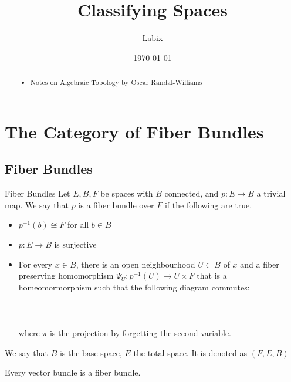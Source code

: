\documentclass[a4paper]{article}
\title{Classifying Spaces}
\author{Labix}
\date{\today}
\begin{document}
\maketitle
\begin{abstract}
\begin{itemize}
\item Notes on Algebraic Topology by Oscar Randal-Williams
\end{itemize}
\end{abstract}
\pagebreak
\tableofcontents

\pagebreak
\section{The Category of Fiber Bundles}
\subsection{Fiber Bundles}
\begin{defn}{Fiber Bundles}{} Let $E,B,F$ be spaces with $B$ connected, and $p:E\to B$ a trivial map. We say that $p$ is a fiber bundle over $F$ if the following are true. 
\begin{itemize}
\item $p^{-1}(b)\cong F$ for all $b\in B$
\item $p:E\to B$ is surjective
\item For every $x\in B$, there is an open neighbourhood $U\subset B$ of $x$ and a fiber preserving homomorphism $\Psi_U:p^{-1}(U)\to U\times F$ that is a homeomormorphism such that the following diagram commutes: \\~\\
\\~\\
where $\pi$ is the projection by forgetting the second variable. 
\end{itemize}
We say that $B$ is the base space, $E$ the total space. It is denoted as $(F,E,B)$
\end{defn}

\begin{lmm}{}{} Every vector bundle is a fiber bundle. 
\end{lmm}
\end{document}
